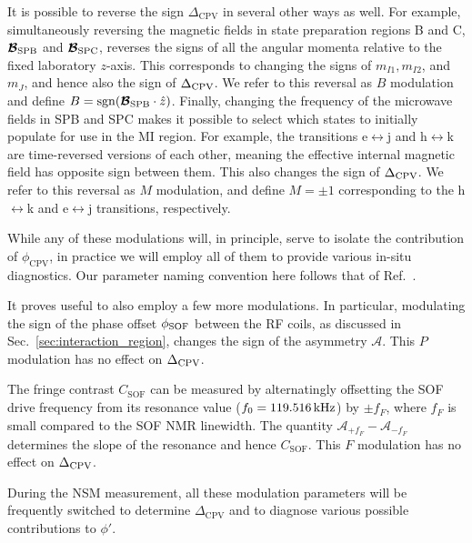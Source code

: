 It is possible to reverse the sign $\Delta_\mathrm{CPV}$ in several other ways as well. For example, simultaneously reversing the magnetic fields in state preparation regions B and C, $\bm{\mathcal{B}}_\mathrm{SPB}$ and $\bm{\mathcal{B}}_\mathrm{SPC}$, reverses the signs of all the angular momenta relative to the fixed laboratory $z$-axis. This corresponds to changing the signs of $m_{I1}, m_{I2}$, and $m_J$, and hence also the sign of $\Delta_{\rm CPV}$. We refer to this reversal as $B$ modulation and define $B = \mathrm{sgn}(\bm{\mathcal{B}}_\mathrm{SPB} \cdot \hat{z})$. Finally, changing the frequency of the microwave fields in SPB and SPC makes it possible to select which states to initially populate for use in the MI region. For example, the transitions e$\leftrightarrow$j and h$\leftrightarrow$k are time-reversed versions of each other, meaning the effective internal magnetic field has opposite sign between them. This also changes the sign of $\Delta_{\rm CPV}$.
We refer to this reversal as $M$ modulation, and define $M = \pm 1$ corresponding to the h$\leftrightarrow$k and e$\leftrightarrow$j transitions, respectively.

While any of these modulations will, in principle, serve to isolate the contribution of $\phi_\mathrm{CPV}$, in practice we will employ all of them to provide various in-situ diagnostics. Our parameter naming convention here follows that of Ref.~\cite{cho1991search}. 

It proves useful to also employ a few more modulations. In particular, modulating the sign of the phase offset $\phi_{\rm SOF}$ between the RF coils, as discussed in Sec.~\ref{sec:interaction_region}, changes the sign of the asymmetry $\mathcal{A}$. This $P$ modulation has no effect on $\Delta_{\rm CPV}$.

The fringe contrast $C_\mathrm{SOF}$ can be measured by alternatingly offsetting the SOF drive frequency from its resonance value ($f_0 = 119.516\,\mathrm{kHz}$) by $\pm f_F$, where $f_F$ is small compared to the SOF NMR linewidth. The quantity $\mathcal{A}_{+f_F}-\mathcal{A}_{-f_F}$ determines the slope of the resonance and hence $C_\mathrm{SOF}$. This $F$ modulation has no effect on $\Delta_{\rm CPV}$.

During the NSM measurement, all these modulation parameters will be frequently switched to determine $\Delta_\mathrm{CPV}$ and to diagnose various possible contributions to $\phi'$. 

